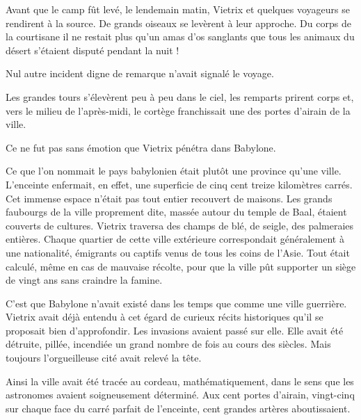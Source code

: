 \documentclass[a4paper, 11pt, oneside, polutonikogreek, french]{article}
\begin{document}
Avant que le camp fût levé, le lendemain matin, Vietrix et quelques voyageurs se rendirent à la source. De grands oiseaux se levèrent à leur approche. Du corps de la courtisane il ne restait plus qu'un amas d'os sanglants que tous les animaux du désert s'étaient disputé pendant la nuit !

Nul autre incident digne de remarque n'avait signalé le voyage.

\bigskip
\centerline{\EightStarTaper}
\centerline{\EightStarTaper\EightStarTaper}
\bigskip

Les grandes tours s'élevèrent peu à peu dans le ciel, les remparts prirent corps et, vers le milieu de l'après-midi, le cortège franchissait une des portes d'airain de la ville.

Ce ne fut pas sans émotion que Vietrix pénétra dans Babylone.

Ce que l'on nommait le pays babylonien était plutôt une province qu'une ville. L'enceinte enfermait, en effet, une superficie de cinq cent treize kilomètres carrés. Cet immense espace n'était pas tout entier recouvert de maisons. Les grands faubourgs de la ville proprement dite, massée autour du temple de Baal, étaient couverts de cultures. Vietrix traversa des champs de blé, de seigle, des palmeraies entières. Chaque quartier de cette ville extérieure correspondait généralement à une nationalité, émigrants ou captifs venus de tous les coins de l'Asie. Tout était calculé, même en cas de mauvaise récolte, pour que la ville pût supporter un siège de vingt ans sans craindre la famine.

C'est que Babylone n'avait existé dans les temps que comme une ville guerrière. Vietrix avait déjà entendu à cet égard de curieux récits historiques qu'il se proposait bien d'approfondir. Les invasions avaient passé sur elle. Elle avait été détruite, pillée, incendiée un grand nombre de fois au cours des siècles. Mais toujours l'orgueilleuse cité avait relevé la tête.

Ainsi la ville avait été tracée au cordeau, mathématiquement, dans le sens que les astronomes avaient soigneusement déterminé. Aux cent portes d'airain, vingt-cinq sur chaque face du carré parfait de l'enceinte, cent grandes artères aboutissaient.

\bigskip
\centerline{\EightStarTaper}
\centerline{\EightStarTaper\EightStarTaper}
\bigskip
\end{document}
